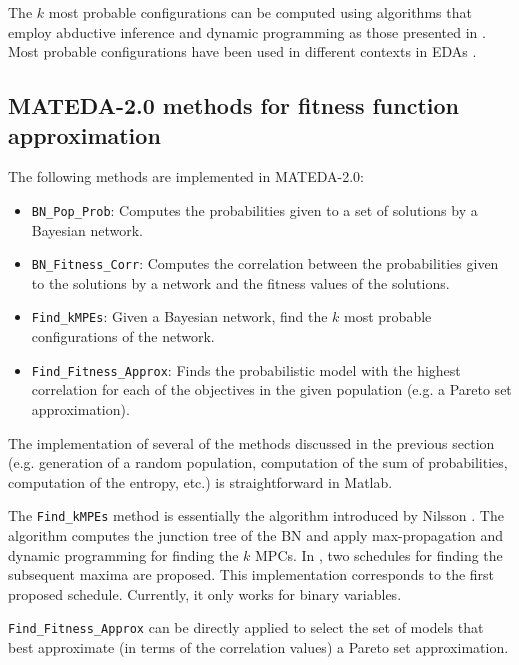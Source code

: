 \documentclass[a4paper]{article}
\begin{document}
The $k$ most probable configurations can be computed using
algorithms that employ abductive inference and dynamic programming
as those presented in
\cite{Hoens_et_al:2007,Nilsson:1998,Yanover_and_Weiss:2004}. Most
probable configurations have been used in different contexts in EDAs
\cite{Echegoyen_et_al:2008a,Hoens_et_al:2007,Mendiburu_et_al:2007a,Soto:2003}.



\subsection{MATEDA-2.0 methods for fitness function approximation}




 The following methods are implemented in MATEDA-2.0:

\begin{itemize}
  \item  \texttt{BN\_Pop\_Prob}: Computes the probabilities given to a set of solutions by a
  Bayesian network.
  \item  \texttt{BN\_Fitness\_Corr}: Computes the correlation between the probabilities given to the solutions by a
   network and the fitness values of the  solutions.
  \item  \texttt{Find\_kMPEs}:  Given a Bayesian network, find the $k$ most probable
              configurations of the network.
  \item \texttt{Find\_Fitness\_Approx}:   Finds the probabilistic model with the
  highest correlation for each of the objectives in the given population (e.g. a Pareto set
  approximation).
\end{itemize}

The implementation of several of the methods discussed in the
previous section (e.g. generation of a random population,
computation of the sum of probabilities, computation of the entropy,
etc.) is straightforward in Matlab.

The \texttt{Find\_kMPEs} method is essentially the algorithm
introduced by Nilsson \cite{Nilsson:1998}. The algorithm computes
the junction tree of the BN and apply max-propagation and dynamic
programming for finding the $k$ MPCs.  In \cite{Nilsson:1998}, two
schedules for finding the subsequent maxima are proposed. This
implementation corresponds to the first proposed schedule.
Currently, it only works for binary variables.

 \texttt{Find\_Fitness\_Approx} can be directly applied to select the set
 of models that best approximate (in terms of the correlation values) a Pareto
 set approximation.
\end{document}
